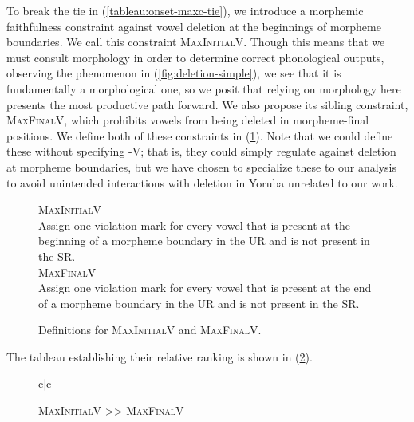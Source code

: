 \documentclass[12pt]{article}
\newcommand{\maxvplus}{\textsc{MaxFinalV}}
\newcommand{\maxplusv}{\textsc{MaxInitialV}}
\newcommand{\pref}[1]{(\ref{#1})}
\begin{document}
To break the tie in \pref{tableau:onset-maxc-tie}, we introduce a morphemic
faithfulness constraint against vowel deletion at the beginnings of morpheme
boundaries. We call this constraint \maxplusv. Though this means that we must
consult morphology in order to determine correct phonological outputs,
observing the phenomenon in \pref{fig:deletion-simple}, we see that it is
fundamentally a morphological one, so we posit that relying on morphology here
presents the most productive path forward. We also propose its sibling
constraint, \maxvplus, which prohibits vowels from being deleted in
morpheme-final positions. We define both of these constraints in
\pref{def:maxvplus-and-maxplusv}. Note that we could define these without
specifying \textsc{-V}; that is, they could simply regulate against deletion
at morpheme boundaries, but we have chosen to specialize these to our analysis
to avoid unintended interactions with deletion in Yoruba unrelated to our work.


\begin{figure}[h]
    \caption{Definitions for \maxplusv{} and \maxvplus.}
    \label{def:maxvplus-and-maxplusv}
    \begin{center}
        \maxplusv\\
        Assign one violation mark for every vowel that is present at the
        beginning of a morpheme boundary in the UR and is not present in the
        SR.\\
        \vspace{1em}
        \maxvplus\\
        Assign one violation mark for every vowel that is present at the end of
        a morpheme boundary in the UR and is not present in the SR.
    \end{center}
\end{figure}

The tableau establishing their relative ranking is shown in
\pref{tableau:maxplusv-wins}.

\begin{figure}[h]
\caption{\maxplusv{} >> \maxvplus}
\label{tableau:maxplusv-wins}
\begin{tableau}{c|c}
        \const{\maxplusv} \const{\maxvplus}
     \vio{}            \vio{*}
               \vio{*!}          \vio{}
\end{tableau}
\end{figure}
\end{document}
